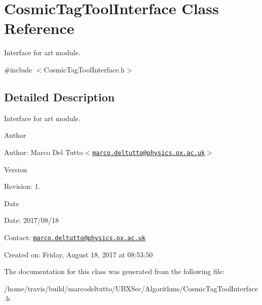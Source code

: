 \hypertarget{classCosmicTagToolInterface}{\section{\-Cosmic\-Tag\-Tool\-Interface \-Class \-Reference}
\label{classCosmicTagToolInterface}
}


\-Interface for art module.  




{\ttfamily \#include $<$\-Cosmic\-Tag\-Tool\-Interface.\-h$>$}



\subsection{\-Detailed \-Description}
\-Interface for art module. 

\begin{DoxyAuthor}{\-Author}

\end{DoxyAuthor}
\begin{DoxyParagraph}{\-Author\-:}
\-Marco \-Del \-Tutto$<$\href{mailto:marco.deltutto@physics.ox.ac.uk}{\tt marco.\-deltutto@physics.\-ox.\-ac.\-uk}$>$ 
\end{DoxyParagraph}


\begin{DoxyVersion}{\-Version}

\end{DoxyVersion}
\begin{DoxyParagraph}{\-Revision\-:}
1. 
\end{DoxyParagraph}


\begin{DoxyDate}{\-Date}

\end{DoxyDate}
\begin{DoxyParagraph}{\-Date\-:}
2017/08/18 
\end{DoxyParagraph}


\-Contact\-: \href{mailto:marco.deltutto@physics.ox.ac.uk}{\tt marco.\-deltutto@physics.\-ox.\-ac.\-uk}

\-Created on\-: \-Friday, \-August 18, 2017 at 08\-:53\-:50 

\-The documentation for this class was generated from the following file\-:\begin{DoxyCompactItemize}
\item 
/home/travis/build/marcodeltutto/\-U\-B\-X\-Sec/\-Algorithms/\-Cosmic\-Tag\-Tool\-Interface.\-h\end{DoxyCompactItemize}
